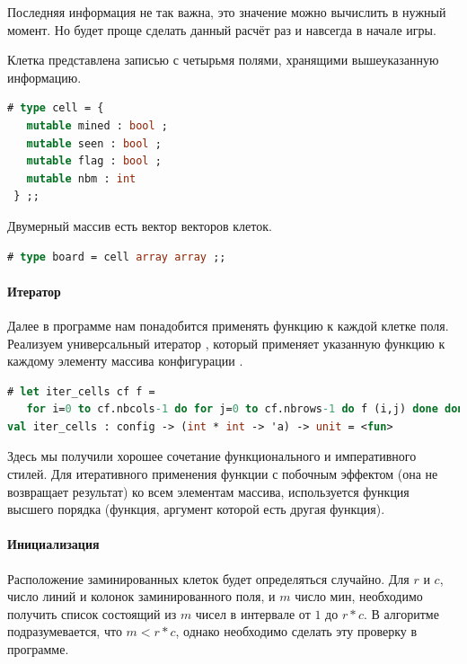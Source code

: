 Последняя информация не так важна, это значение можно вычислить в нужный момент. 
Но будет проще сделать данный расчёт раз и навсегда в начале игры.

Клетка представлена записью с четырьмя полями, хранящими вышеуказанную 
информацию.

\begin{lstlisting}[language=OCaml]
# type cell = { 
   mutable mined : bool ;
   mutable seen : bool ; 
   mutable flag : bool ; 
   mutable nbm : int
 } ;;
\end{lstlisting}

Двумерный массив есть вектор векторов клеток.

\begin{lstlisting}[language=OCaml]
# type board = cell array array ;;
\end{lstlisting}

\paragraph{Итератор}

Далее в программе нам понадобится применять функцию к каждой клетке поля. 
Реализуем универсальный итератор , который применяет 
указанную функцию  к каждому элементу массива конфигурации .

\begin{lstlisting}[language=OCaml]
# let iter_cells cf f = 
   for i=0 to cf.nbcols-1 do for j=0 to cf.nbrows-1 do f (i,j) done done ;;
val iter_cells : config -> (int * int -> 'a) -> unit = <fun>
\end{lstlisting}

Здесь мы получили хорошее сочетание функционального и императивного стилей. Для 
итеративного применения функции с побочным эффектом (она не возвращает 
результат) ко всем элементам массива, используется функция высшего порядка 
(функция, аргумент которой есть другая функция).

\paragraph{Инициализация}

Расположение заминированных клеток будет определяться случайно. Для $r$ и $c$, 
число линий и колонок заминированного поля, и $m$ число мин, необходимо 
получить список состоящий из $m$ чисел в интервале от $1$ до $r * c$. В 
алгоритме подразумевается, что $m < r * c$, однако необходимо сделать эту 
проверку в программе.


